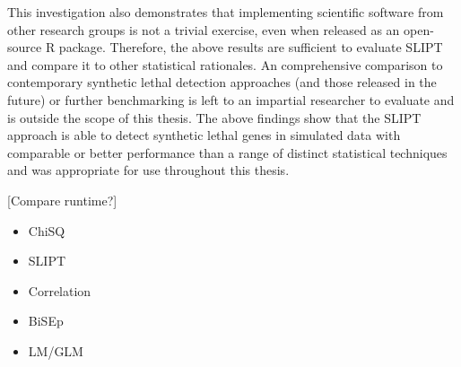 This investigation also demonstrates that implementing scientific software from other research groups is not a trivial exercise, even when released as an open-source R package. Therefore, the above results are sufficient to evaluate \gls{SLIPT} and compare it to other statistical rationales. An comprehensive comparison to contemporary synthetic lethal detection approaches (and those released in the future) or further benchmarking is left to an impartial researcher to evaluate and is outside the scope of this thesis. The above findings show that the \gls{SLIPT} approach is able to detect synthetic lethal genes in simulated data with comparable or better performance than a range of distinct statistical techniques and was appropriate for use throughout this thesis.  

\iffalse

\begin{itemize}
 \item Designed for global SL
 \item Unable to detect SL partners in TCGA data
 \item Source code modified to test partners of query gene (R package)
 \item Still unable to identify SL genes for CDH1 in TCGA
 \item Computationally-intensive, longer to run than SLIPT, more difficult to evaluate many iterations
 \item Unable to identify SL candidates in a limited number of simulations
 \item Assumes Bi-modal distribution detectable: not appropriate for normalised expression data (standard in the RNA-Seq analysis) or ranked (metagenes) -- may be applicable to other datasets
 \item Comparing software is non-trivial (even those released as R packages), the above results are sufficent to evaluate \gls{SLIPT}, and further benchmarking out of scope.
\end{itemize}

\subsubsubsection{Implementation and Computation Time}
\label{chapt5:compare_compute_time}
\fi

[Compare runtime?]

\iffalse
\begin{itemize}
 \item ChiSQ
 \item SLIPT
 \item Correlation
 \item BiSEp
 \item LM/GLM
\end{itemize}


